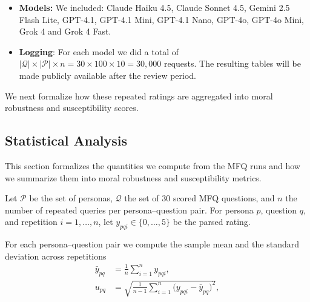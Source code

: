 \documentclass{article}
\begin{document}
\begin{itemize}
  \item \textbf{Models:} We included: Claude Haiku 4.5, Claude Sonnet 4.5, Gemini 2.5 Flash Lite, GPT-4.1, GPT-4.1 Mini, GPT-4.1 Nano, GPT-4o, GPT-4o Mini, Grok 4 and Grok 4 Fast.
  \item \textbf{Logging}: For each model we did a total of $|\mathcal{Q}|\times|\mathcal{P}|\times n =30\times 100\times 10=30,000$ requests. The resulting tables will be made publicly available after the review period.
\end{itemize}
We next formalize how these repeated ratings are aggregated into moral robustness and susceptibility scores.

\subsection{Statistical Analysis}



This section formalizes the quantities we compute from the MFQ runs and how we summarize them into moral robustness and susceptibility metrics.

Let \(\mathcal{P}\) be the set of personas, \(\mathcal{Q}\) the set of 30 scored MFQ questions, and \(n\) the number of repeated queries per persona--question pair. For persona \(p\), question \(q\), and repetition \(i=1,\ldots,n\), let \(y_{pqi}\in\{0,\ldots,5\}\) be the parsed rating.

For each persona--question pair we compute the sample mean and the standard deviation across repetitions
\begin{align}
  \bar{y}_{pq} &= \frac{1}{n} \sum_{i=1}^{n} y_{pqi}, \label{eq:persona-question-mean}\\
  u_{pq} &= \sqrt{\frac{1}{n-1} \sum_{i=1}^{n} \big(y_{pqi} - \bar{y}_{pq}\big)^2}, \label{eq:persona-question-se}
\end{align}
\end{document}
